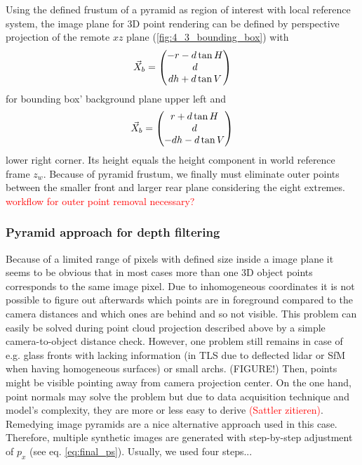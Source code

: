 \documentclass[review]{elsarticle}
\begin{document}
Using the defined frustum of a pyramid as region of interest with local reference system, the image plane for 3D point rendering can be defined by perspective projection of the remote $xz$ plane (\ref{fig:4_3_bounding_box}) with 
\begin{equation}
\vec{X}_b = \begin{pmatrix}
-r - d \tan H \\
d \\
dh + d \tan V
\end{pmatrix}
\notag
\end{equation} 
for bounding box' background plane upper left and 
\begin{equation}
\vec{X}_b =\begin{pmatrix}
r + d \tan H\\
d\\
-dh - d \tan V
\end{pmatrix}
\notag
\end{equation} 
lower right corner. Its height equals the height component in world reference frame $z_w$. Because of pyramid frustum, we finally must eliminate outer points between the smaller front and larger rear plane considering the eight extremes. \textcolor{red}{workflow for outer point removal necessary?}

\subsubsection{Pyramid approach for depth filtering}
Because of a limited range of pixels with defined size inside a image plane it seems to be obvious that in most cases more than one 3D object points corresponds to the same image pixel. Due to inhomogeneous coordinates it is not possible to figure out afterwards which points are in foreground compared to the camera distances and which ones are behind and so not visible. This problem can easily be solved during point cloud projection described above by a simple camera-to-object distance check. However, one problem still remains in case of e.g. glass fronts with lacking information (in \gls{TLS} due to deflected lidar or \gls{SfM} when having homogeneous surfaces) or small archs. (FIGURE!) Then, points might be visible pointing away from camera projection center. On the one hand, point normals may solve the problem but due to data acquisition technique and model's complexity, they are more or less easy to derive \textcolor{red}{(Sattler zitieren)}. 
Remedying image pyramids are a nice alternative approach used in this case. Therefore, multiple synthetic images are generated with step-by-step adjustment of $p_x$ (see eq. \ref{eq:final_ps}). Usually, we used four steps... 
\end{document}
